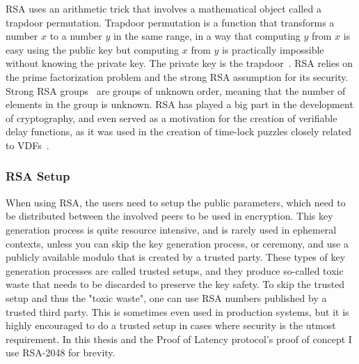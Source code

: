 RSA uses an arithmetic trick that involves a mathematical object called a trapdoor permutation. Trapdoor permutation is a function that transforms a number \(x\) to a number \(y\) in the same range, in a way that computing \(y\) from \(x\) is easy using the public key but computing \(x\) from \(y\) is practically impossible without knowing the private key. The private key is the trapdoor~\cite{Aumasson2018-nh}. RSA relies on the prime factorization problem and the strong RSA assumption for its security. Strong RSA groups~\cite{Rivest2005-kc} are groups of unknown order, meaning that the number of elements in the group is unknown. RSA has played a big part in the development of cryptography, and even served as a motivation for the creation of verifiable delay functions, as it was used in the creation of time-lock puzzles closely related to VDFs~\cite{Boneh2018-sm}.

\subsubsection{RSA Setup}
When using RSA, the users need to setup the public parameters, which need to be distributed between the involved peers to be used in encryption. This key generation process is quite resource intensive, and is rarely used in ephemeral contexts, unless you can skip the key generation process, or ceremony, and use a publicly available modulo that is created by a trusted party. These types of key generation processes are called trusted setups, and they produce so-called toxic waste that needs to be discarded to preserve the key safety. To skip the trusted setup and thus the "toxic waste", one can use RSA numbers published by a trusted third party. This is sometimes even used in production systems, but it is highly encouraged to do a trusted setup in cases where security is the utmost requirement. In this thesis and the Proof of Latency protocol's proof of concept I use RSA-2048 for brevity.

